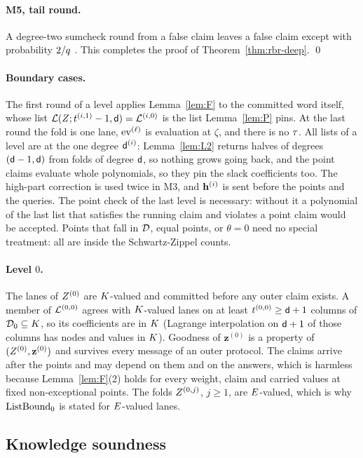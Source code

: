 \paragraph{M5, tail round.} A degree-two sumcheck round from a false claim leaves a false claim except with probability $2/q$ \cite{LFKN92}. This completes the proof of Theorem~\ref{thm:rbr-deep}. \qed

\paragraph{Boundary cases.} The first round of a level applies Lemma~\ref{lem:F} to the committed word itself, whose list $\mathcal{L}(Z;t^{(i,1)}-1,\mathsf{d})=\mathcal{L}^{(i,0)}$ is the list Lemma~\ref{lem:P} pins. At the last round the fold is one lane, $\operatorname{ev}^{(\ell)}$ is evaluation at $\zeta$, and there is no $\tau$. All lists of a level are at the one degree $\mathsf{d}^{(i)}$: Lemma~\ref{lem:L2} returns halves of degrees $(\mathsf{d}-1,\mathsf{d})$ from folds of degree $\mathsf{d}$, so nothing grows going back, and the point claims evaluate whole polynomials, so they pin the slack coefficients too. The high-part correction is used twice in M3, and $\mathbf{h}^{(i)}$ is sent before the points and the queries. The point check of the last level is necessary: without it a polynomial of the last list that satisfies the running claim and violates a point claim would be accepted. Points that fall in $\mathcal{D}$, equal points, or $\theta=0$ need no special treatment: all are inside the Schwartz-Zippel counts.

\paragraph{Level $0$.} The lanes of $Z^{(0)}$ are $K$-valued and committed before any outer claim exists. A member of $\mathcal{L}^{(0,0)}$ agrees with $K$-valued lanes on at least $t^{(0,0)}\ge\mathsf{d}+1$ columns of $\mathcal{D}_0\subseteq K$, so its coefficients are in $K$ (Lagrange interpolation on $\mathsf{d}+1$ of those columns has nodes and values in $K$). Goodness of $\mathbf z^{(0)}$ is a property of $(Z^{(0)},\mathbf z^{(0)})$ and survives every message of an outer protocol. The claims arrive after the points and may depend on them and on the answers, which is harmless because Lemma~\ref{lem:F}(2) holds for every weight, claim and carried values at fixed non-exceptional points. The folds $Z^{(0,j)}$, $j\ge1$, are $E$-valued, which is why $\mathrm{ListBound}_0$ is stated for $E$-valued lanes.

\subsection{Knowledge soundness}\label{sec:ks}

